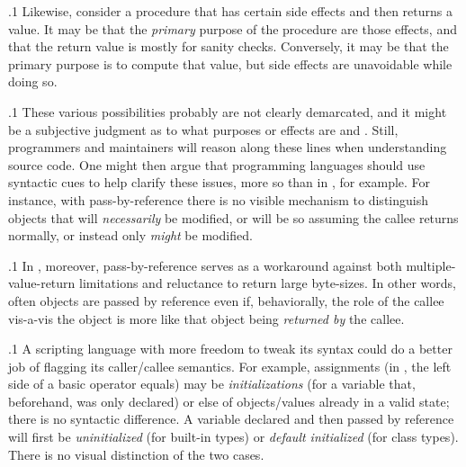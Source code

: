 \documentclass[11pt, twocolumn]{article}
\begin{document}
\p.1{%
Likewise, consider a procedure that has certain side
effects and then returns a value. It may be that the
\textit{primary} purpose of the procedure are those
effects, and that the return value is mostly for sanity
checks. Conversely, it may be that the primary purpose
is to compute that value, but side effects are
unavoidable while doing so.
}%

\p.1{%
These various possibilities probably are not clearly
demarcated, and it might be a subjective judgment as
to what purposes or effects are  and .
Still, programmers and maintainers will reason
along these lines when understanding source code.
One might then argue that programming languages
should use syntactic cues to help clarify
these issues, more so than in , for example.
For instance, with pass-by-reference there is no
visible mechanism to distinguish objects that
will \textit{necessarily} be modified, or will be
so assuming the callee returns normally,
or instead only \textit{might} be modified.
}%

\p.1{%
In , moreover, pass-by-reference serves as a workaround
against both multiple-value-return limitations
and reluctance to return large byte-sizes.
In other words, often objects are passed
by reference even if, behaviorally, the
role of the callee vis-a-vis the object is
more like that object being \textit{returned by}
the callee.
}%

\p.1{%
A scripting language \mdash{} with more freedom to tweak its
syntax \mdash{} could do a better job of flagging its caller/callee
semantics. For example, assignments (in , the left
side of a basic operator equals) may be
\textit{initializations} (for a variable that, beforehand,
was only declared) or else  of objects/values
already in a valid state;
there is no syntactic difference. A variable declared
and then passed by reference will first be
\textit{uninitialized} (for built-in types) or \textit{default initialized}
(for class types). There is no visual distinction of the two cases.
}%
\end{document}
